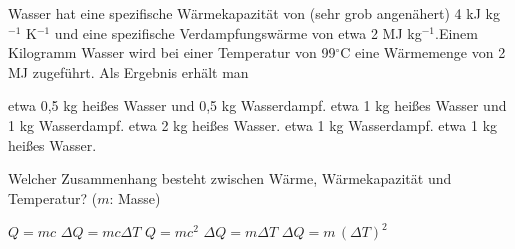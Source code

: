 \documentclass[11pt]{exam}
\begin{document}
\begin{questions}
\vspace{3mm}\question Wasser hat eine spezifische Wärmekapazität von (sehr grob angenähert) 4 kJ kg\(^{-1}\) K\(^{-1}\) und eine spezifische Verdampfungswärme von etwa 2 MJ kg\(^{-1}\).Einem Kilogramm Wasser wird bei einer Temperatur von 99\(^\circ\)C eine Wärmemenge von 2 MJ zugeführt. Als Ergebnis erhält man

\begin{choices}
	\choice etwa 0,5 kg heißes Wasser und 0,5 kg Wasserdampf.
	\choice etwa 1 kg heißes Wasser und 1 kg Wasserdampf.
	\choice etwa 2 kg heißes Wasser.
	\choice etwa 1 kg Wasserdampf.
	\choice etwa 1 kg heißes Wasser.
\end{choices}

\vspace{3mm}\question Welcher Zusammenhang besteht zwischen Wärme, Wärmekapazität und Temperatur? (\(m\): Masse)

\begin{choices}
	\choice \(Q = m c\)
	\choice \(\Delta Q = m c \Delta T\)
	\choice \(Q = m c^2\)
	\choice \(\Delta Q = m \Delta T\)
	\choice \(\Delta Q = m \, (\Delta T)^2\)
\end{choices}

\vspace{3mm}\end{questions}
\end{document}
